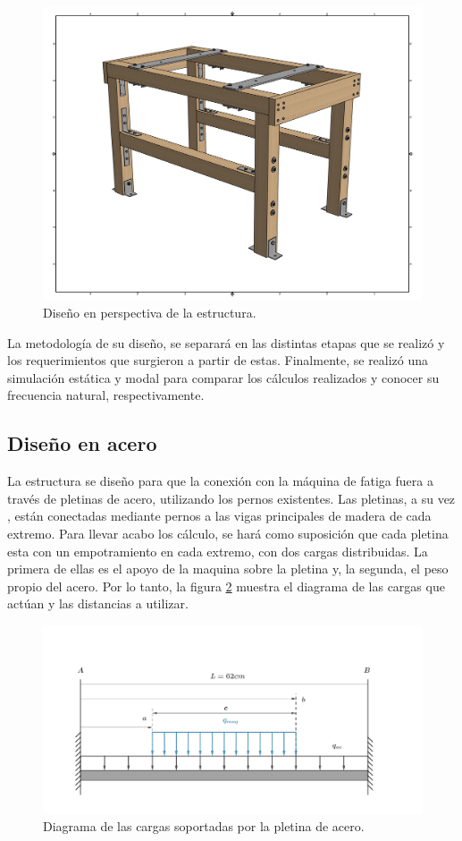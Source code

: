 \begin{figure}[h]
\centering
\includegraphics[width=0.9\linewidth, trim={5cm 3cm 5cm 3cm},clip]{Imagenes/mesa_persp.pdf}
\caption{Diseño en perspectiva de la estructura.}
\label{fig:mesa_persp}
\end{figure}

La metodología de su diseño, se separará en las distintas etapas que se realizó y los requerimientos que surgieron a partir de estas. Finalmente, se realizó una simulación estática y modal para comparar los cálculos realizados y conocer su frecuencia natural, respectivamente.
\subsection{Diseño en acero}
La estructura se diseño para que la conexión con la máquina de fatiga fuera a través de pletinas de acero, utilizando los pernos existentes. Las pletinas, a su vez , están conectadas mediante pernos a las vigas principales de madera de cada extremo. Para llevar acabo los cálculo, se hará como suposición que cada pletina esta con un empotramiento en cada extremo, con dos cargas distribuidas. La primera de ellas es el apoyo de la maquina sobre la pletina y, la segunda, el peso propio del acero. Por lo tanto, la figura \ref{fig:diagcargas_viga_acero} muestra el diagrama de las cargas que actúan y las distancias a utilizar. 

\begin{figure}[h]
\centering
\includegraphics[width=1\linewidth,trim={2cm 1cm 4cm 5cm},clip]{Imagenes/dia_viga_acero.pdf}
\caption{Diagrama de las cargas soportadas por la pletina de acero.}
\label{fig:diagcargas_viga_acero}
\end{figure}

